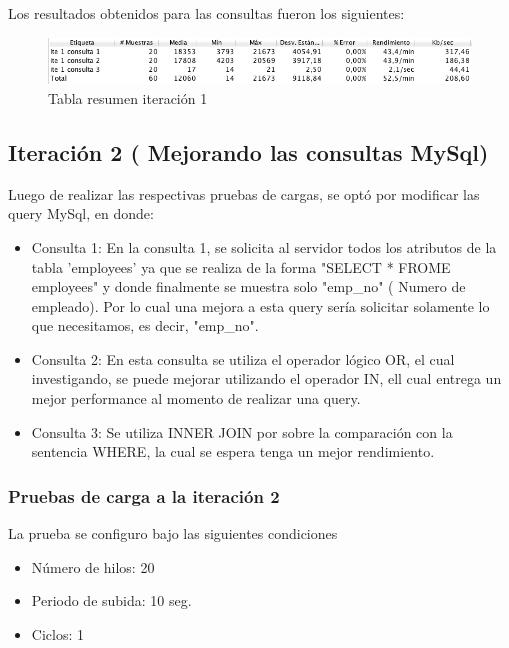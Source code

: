 Los resultados obtenidos para las consultas fueron los siguientes:

 \begin{figure}[htb]
 	\label{Figura8}
 	\begin{center}
 		\includegraphics[scale=0.6]{imagenes/ite1.png}
 		\caption{Tabla resumen iteración 1}
 	\end{center}
 \end{figure}
 
\subsection{Iteración 2 ( Mejorando las consultas MySql)} 

Luego de realizar las respectivas pruebas de cargas, se optó por modificar las query MySql, en donde: 


\begin{itemize}
	\item Consulta 1: En la consulta 1, se solicita al servidor todos los atributos de la tabla 'employees' ya que se realiza de la forma "SELECT * FROME employees" y donde finalmente se muestra solo "emp\_no" ( Numero de empleado). Por lo cual una mejora a esta query sería solicitar solamente lo que necesitamos, es decir, "emp\_no".\\
	
	\item Consulta 2: En esta consulta se utiliza el operador lógico OR, el cual investigando, se puede mejorar utilizando el operador IN, ell cual entrega un mejor performance al momento de realizar una query.\\
	
	\item Consulta 3: Se utiliza INNER JOIN por sobre la comparación con la sentencia WHERE, la cual se espera tenga un mejor rendimiento.
\end{itemize}

\subsubsection{Pruebas de carga a la iteración 2}

La prueba se configuro bajo las siguientes condiciones

\begin{itemize}
	\item Número de hilos: 20
	\item Periodo de subida: 10 seg.
	\item Ciclos: 1
\end{itemize}

